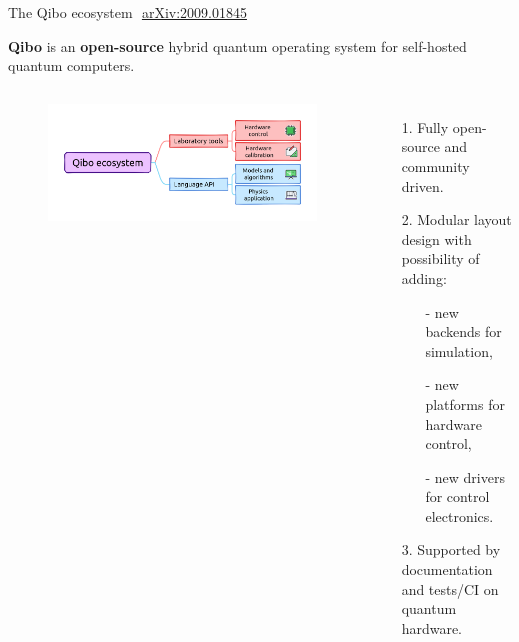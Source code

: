 \documentclass[aspectratio=169, 8pt, xcolor={svgnames}, hyperref={linkcolor=black}]{beamer}
\begin{document}
\begin{frame}{The Qibo ecosystem\hfill \faBook\,\, \href{https://arxiv.org/abs/2009.01845}{arXiv:2009.01845}}

   \textbf{Qibo} is an \textbf{open-source} hybrid quantum operating system for self-hosted quantum computers.
   \begin{columns}
     \column{6cm}
     \begin{figure}
       \includegraphics[width=1\textwidth]{figures/overview.png}
     \end{figure}
     \vspace{-0.5cm}
   \begin{itemize}
     \item[1.] Fully open-source and community driven.
     \item[2.] Modular layout design with possibility of adding:
     \begin{itemize}[noitemsep]
       \item[-] new backends for simulation,
       \item[-] new platforms for hardware control,
       \item[-] new drivers for control electronics.
     \end{itemize}
     \item[3.] Supported by documentation and tests/CI on quantum hardware.
   \end{itemize}


\end{columns}
\end{frame}
\end{document}
